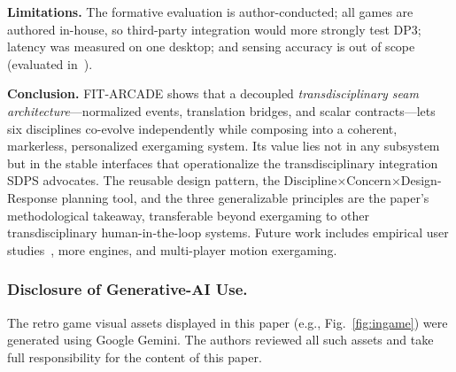 \documentclass[runningheads]{llncs}
\newcommand{\sys}{\textsc{FIT-ARCADE}}
\newcommand{\citecompanion}{\cite{companion2026}}
\begin{document}
\textbf{Limitations.} The formative evaluation is author-conducted; all games are authored
in-house, so third-party integration would more strongly test DP3; latency was measured on
one desktop; and sensing accuracy is out of scope (evaluated in~\citecompanion{}).

\textbf{Conclusion.} \sys{} shows that a decoupled \emph{transdisciplinary seam
architecture}---normalized events, translation bridges, and scalar contracts---lets six
disciplines co-evolve independently while composing into a coherent, markerless,
personalized exergaming system. Its value lies not in any subsystem but in the stable
interfaces that operationalize the transdisciplinary integration SDPS advocates. The
reusable design pattern, the Discipline$\times$Concern$\times$Design-Response planning
tool, and the three generalizable principles are the paper's methodological takeaway,
transferable beyond exergaming to other transdisciplinary human-in-the-loop systems.
Future work includes empirical user studies~\citecompanion{}, more engines, and
multi-player motion exergaming.

\subsubsection*{Disclosure of Generative-AI Use.}
The retro game visual assets displayed in this paper (e.g., Fig.~\ref{fig:ingame}) were
generated using Google Gemini. The authors reviewed all such assets and take full
responsibility for the content of this paper.



\end{document}
